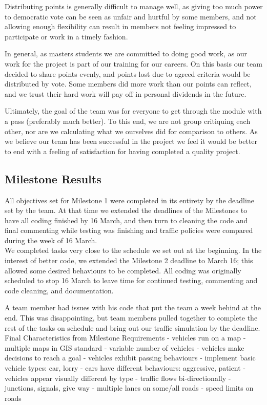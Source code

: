 \documentclass[11pt]{article}
\begin{document}
\begin{enumerate}
Distributing points is generally difficult to manage well, as giving too much power to democratic vote can be seen as unfair and hurtful by some members, and not allowing enough flexibility can result in members not feeling impressed to participate or work in a timely fashion. 

In general, as masters students we are committed to doing good work, as our work for the project is part of our training for our careers. On this basis our team decided to share points evenly, and points lost due to agreed criteria would be distributed by vote. Some members did more work than our points can reflect, and we trust their hard work will pay off in personal dividends in the future.

Ultimately, the goal of the team was for everyone to get through the module with a pass (preferably much better). To this end, we are not group critiquing each other, nor are we calculating what we ourselves did for comparison to others. As we believe our team has been successful in the project we feel it would be better to end with a feeling of satisfaction for having completed a quality project.


\subsection{Milestone Results}

All objectives set for Milestone 1 were completed in its entirety by the deadline set by the team. At that time we extended the deadlines of the Milestones to have all coding finished by 16 March, and then turn to cleaning the code and final commenting while testing was finishing and traffic policies were compared during the week of 16 March.
\\
We completed tasks very close to the schedule we set out at the beginning. In the interest of better code, we extended the Milestone 2 deadline to March 16; this allowed some desired behaviours to be completed. All coding was originally scheduled to stop 16 March to leave time for continued testing, commenting and code cleaning, and documentation. 

A team member had issues with his code that put the team a week behind at the end. This was disappointing, but team members pulled together to complete the rest of the tasks on schedule and bring out our traffic simulation by the deadline.
\\

Final Characteristics from Milestone Requirements
- vehicles run on a map
- multiple maps in GIS standard
- variable number of vehicles
- vehicles make decisions to reach a goal
- vehicles exhibit passing behaviours 
- implement basic vehicle types: car, lorry
- cars have different behaviours: aggressive, patient
- vehicles appear visually different by type
- traffic flows bi-directionally
- junctions, signals, give way 
- multiple lanes on some/all roads
- speed limits on roads



\end{enumerate}
\end{document}
